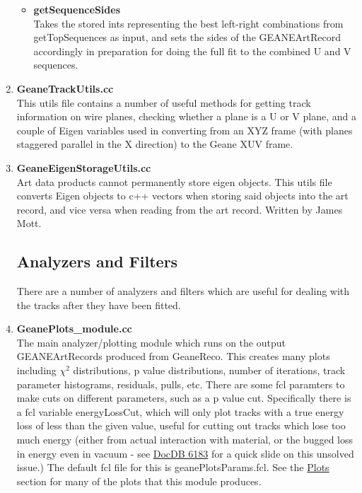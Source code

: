 \begin{enumerate}
\begin{itemize}
          \item{\bf{getSequenceSides}} \\
          Takes the stored ints representing the best left-right combinations from getTopSequences as input, and sets the sides of the GEANEArtRecord accordingly in preparation for doing the full fit to the combined U and V sequences.

        \end{itemize}

      \item{\bf{GeaneTrackUtils.cc}} \\
      This utils file contains a number of useful methods for getting track information on wire planes, checking whether a plane is a U or V plane, and a couple of Eigen variables used in converting from an XYZ frame (with planes staggered parallel in the X direction) to the Geane XUV frame.

      \item{\bf{GeaneEigenStorageUtils.cc}} \\
      Art data products cannot permanently store eigen objects. This utils file converts Eigen objects to c++ vectors when storing said objects into the art record, and vice versa when reading from the art record. Written by James Mott.



  \subsection{Analyzers and Filters}

  There are a number of analyzers and filters which are useful for dealing with the tracks after they have been fitted.

      \item{\bf{GeanePlots\_module.cc}} \\
      The main analyzer/plotting module which runs on the output GEANEArtRecords produced from GeaneReco. This creates many plots including $\chi^{2}$ distributions, p value distributions, number of iterations, track parameter histograms, residuals, pulls, etc. There are some fcl paramters to make cuts on different parameters, such as a p value cut. Specifically there is a fcl variable energyLossCut, which will only plot tracks with a true energy loss of less than the given value, useful for cutting out tracks which lose too much energy (either from actual interaction with material, or the bugged loss in energy even in vacuum - see \href{https://gm2-docdb.fnal.gov/cgi-bin/private/ShowDocument?docid=6183}{DocDB 6183} for a quick slide on this unsolved issue.) The default fcl file for this is geanePlotsParams.fcl. See the \hyperref[sec:Plots]{Plots} section for many of the plots that this module produces.


\end{enumerate}
